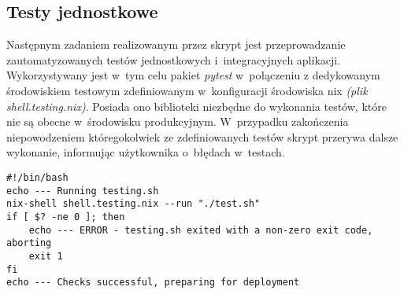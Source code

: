 \subsection{Testy jednostkowe}
Następnym zadaniem realizowanym przez skrypt jest przeprowadzanie zautomatyzowanych testów jednostkowych i~integracyjnych aplikacji. Wykorzystywany jest w~tym celu pakiet \textit{pytest} w~połączeniu z dedykowanym środowiskiem testowym zdefiniowanym w~konfiguracji środowiska nix \textit{(plik shell.testing.nix)}. Posiada ono biblioteki niezbędne do wykonania testów, które nie są obecne w~środowisku produkcyjnym. W~przypadku zakończenia niepowodzeniem któregokolwiek ze zdefiniowanych testów skrypt przerywa dalsze wykonanie, informując użytkownika o~błędach w~testach.
\lstset{style=shell}
\begin{lstlisting}[caption = {Wywołanie skryptu pozwalającego na automatyczne testowanie aplikacji w~ramach środowiska zdefiniowanego w~pliku \textit{shell.testing.sh}}]
#!/bin/bash
echo --- Running testing.sh 
nix-shell shell.testing.nix --run "./test.sh"
if [ $? -ne 0 ]; then
    echo --- ERROR - testing.sh exited with a non-zero exit code, aborting
    exit 1
fi
echo --- Checks successful, preparing for deployment
\end{lstlisting}

